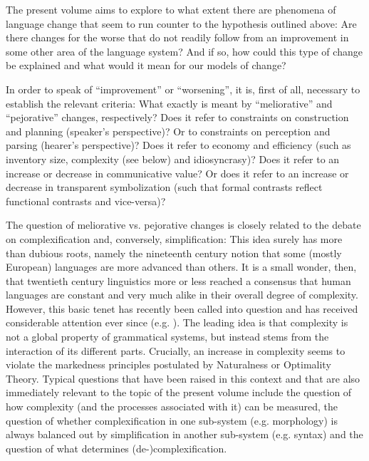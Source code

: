 \documentclass[output=paper,hidelinks]{langscibook}
\begin{document}
The present volume aims to explore to what extent there are phenomena of language change that seem to run counter to the hypothesis outlined above: Are there changes for the worse that do not readily follow from an improvement in some other area of the language system? And if so, how could this type of change be explained and what would it mean for our models of change? 

In order to speak of ``improvement'' or ``worsening'', it is, first of all, necessary to establish the relevant criteria: What exactly is meant by ``meliorative'' and ``pejorative'' changes, respectively? Does it refer to constraints on construction and planning (speaker's perspective)? Or to constraints on perception and parsing (hearer's perspective)? Does it refer to economy and efficiency (such as inventory size, complexity (see below) and idiosyncrasy)? Does it refer to an increase or decrease in communicative value? Or does it refer to an increase or decrease in transparent symbolization (such that formal contrasts reflect functional contrasts and vice-versa)?

\begin{sloppypar}
The question of meliorative vs. pejorative changes is closely related to the debate on complexification and, conversely, simplification: This idea surely has more than dubious roots, namely the nineteenth century notion that some (mostly European) languages are more advanced than others. It is a small wonder, then, that twentieth century linguistics more or less reached a consensus that human languages are constant and very much alike in their overall degree of complexity. However, this basic tenet has recently been called into question and has received considerable attention ever since (e.g. \citealt{Dahl_2004, MiestamoEtAl2008, Garrett_2008, Albright_2008, Sampson_2009, Trudgill_2011, Newmeyer_2014, SeilerBaechler_2016}). The leading idea is that complexity is not a global property of grammatical systems, but instead stems from the interaction of its different parts. Crucially, an increase in complexity seems to violate the markedness principles postulated by Naturalness or Optimality Theory. Typical questions that have been raised in this context and that are also immediately relevant to the topic of the present volume include the question of how complexity (and the processes associated with it) can be measured, the question of whether complexification in one sub-system (e.g. morphology) is always balanced out by simplification in another sub-system (e.g. syntax) and the question of what determines (de-)complexification.
\end{sloppypar}
    
\end{document}
